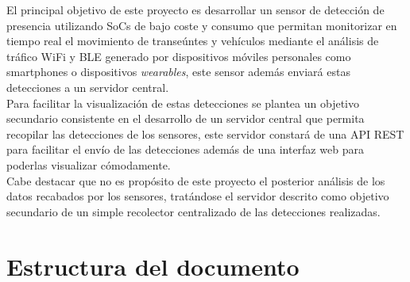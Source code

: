 \documentclass[../proyecto.tex]{subfiles}
\begin{document}
El principal objetivo de este proyecto es desarrollar un sensor de detección de presencia utilizando SoCs de bajo coste y consumo que permitan monitorizar en tiempo real el movimiento de transeúntes y vehículos mediante el análisis de tráfico WiFi y BLE generado por dispositivos móviles personales como smartphones o dispositivos \textit{wearables}, este sensor además enviará estas detecciones a un servidor central.\\

Para facilitar la visualización de estas detecciones se plantea un objetivo secundario consistente en el desarrollo de un servidor central que permita recopilar las detecciones de los sensores, este servidor constará de una API REST para facilitar el envío de las detecciones además de una interfaz web para poderlas visualizar cómodamente.\\

Cabe destacar que no es propósito de este proyecto el posterior análisis de los datos recabados por los sensores, tratándose el servidor descrito como objetivo secundario de un simple recolector centralizado de las detecciones realizadas.\\

\section{Estructura del documento}
\end{document}
